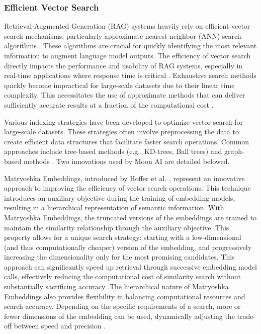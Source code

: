 \documentclass[a4paper, oneside]{discothesis}
\begin{document}
\subsubsection{Efficient Vector Search}
Retrieval-Augmented Generation (RAG) systems heavily rely on efficient vector search mechanisms, particularly approximate nearest neighbor (ANN) search algorithms \cite{johnson2019billion}. These algorithms are crucial for quickly identifying the most relevant information to augment language model outputs. The efficiency of vector search directly impacts the performance and usability of RAG systems, especially in real-time applications where response time is critical \cite{lewis2020retrieval}. Exhaustive search methods quickly become impractical for large-scale datasets due to their linear time complexity. This necessitates the use of approximate methods that can deliver sufficiently accurate results at a fraction of the computational cost \cite{andoni2018approximate}.

Various indexing strategies have been developed to optimize vector search for large-scale datasets. These strategies often involve preprocessing the data to create efficient data structures that facilitate faster search operations. Common approaches include tree-based methods (e.g., KD-trees, Ball trees) and graph-based methods \cite{malkov2018efficient}. Two innovations used by Moon AI are detailed belowed.

Matryoshka Embeddings, introduced by Hoffer et al. \cite{hoffer2018deep}, represent an innovative approach to improving the efficiency of vector search operations. This technique introduces an auxiliary objective during the training of embedding models, resulting in a hierarchical representation of semantic information. With Matryoshka Embeddings, the truncated versions of the embeddings are trained to maintain the similarity relationship through the auxiliary objective. This property allows for a unique search strategy: starting with a low-dimensional (and thus computationally cheaper) version of the embedding, and progressively increasing the dimensionality only for the most promising candidates. This approach can significantly speed up retrieval through successive embedding model calls, effectively reducing the computational cost of similarity search without substantially sacrificing accuracy \cite{hoffer2018deep}.The hierarchical nature of Matryoshka Embeddings also provides flexibility in balancing computational resources and search accuracy. Depending on the specific requirements of a search, more or fewer dimensions of the embedding can be used, dynamically adjusting the trade-off between speed and precision \cite{hoffer2018deep}.
\end{document}

